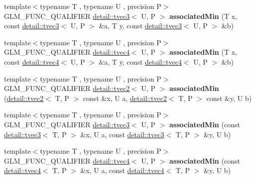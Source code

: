 \begin{DoxyCompactItemize}
\item 
{\footnotesize template$<$typename T , typename U , precision P$>$ }\\G\+L\+M\+\_\+\+F\+U\+N\+C\+\_\+\+Q\+U\+A\+L\+I\+F\+I\+ER \hyperlink{structglm_1_1detail_1_1tvec3}{detail\+::tvec3}$<$ U, P $>$ {\bfseries associated\+Min} (T x, const \hyperlink{structglm_1_1detail_1_1tvec3}{detail\+::tvec3}$<$ U, P $>$ \&a, T y, const \hyperlink{structglm_1_1detail_1_1tvec3}{detail\+::tvec3}$<$ U, P $>$ \&b)\hypertarget{namespaceglm_a546b865980a6592d3b0223d74ee70907}{}\label{namespaceglm_a546b865980a6592d3b0223d74ee70907}

\item 
{\footnotesize template$<$typename T , typename U , precision P$>$ }\\G\+L\+M\+\_\+\+F\+U\+N\+C\+\_\+\+Q\+U\+A\+L\+I\+F\+I\+ER \hyperlink{structglm_1_1detail_1_1tvec4}{detail\+::tvec4}$<$ U, P $>$ {\bfseries associated\+Min} (T x, const \hyperlink{structglm_1_1detail_1_1tvec4}{detail\+::tvec4}$<$ U, P $>$ \&a, T y, const \hyperlink{structglm_1_1detail_1_1tvec4}{detail\+::tvec4}$<$ U, P $>$ \&b)\hypertarget{namespaceglm_a1276323c70c6a08d73089c1f3734d3a1}{}\label{namespaceglm_a1276323c70c6a08d73089c1f3734d3a1}

\item 
{\footnotesize template$<$typename T , typename U , precision P$>$ }\\G\+L\+M\+\_\+\+F\+U\+N\+C\+\_\+\+Q\+U\+A\+L\+I\+F\+I\+ER \hyperlink{structglm_1_1detail_1_1tvec2}{detail\+::tvec2}$<$ U, P $>$ {\bfseries associated\+Min} (\hyperlink{structglm_1_1detail_1_1tvec2}{detail\+::tvec2}$<$ T, P $>$ const \&x, U a, \hyperlink{structglm_1_1detail_1_1tvec2}{detail\+::tvec2}$<$ T, P $>$ const \&y, U b)\hypertarget{namespaceglm_a4e89b83acf8c80dc111e5152e8e52a75}{}\label{namespaceglm_a4e89b83acf8c80dc111e5152e8e52a75}

\item 
{\footnotesize template$<$typename T , typename U , precision P$>$ }\\G\+L\+M\+\_\+\+F\+U\+N\+C\+\_\+\+Q\+U\+A\+L\+I\+F\+I\+ER \hyperlink{structglm_1_1detail_1_1tvec3}{detail\+::tvec3}$<$ U, P $>$ {\bfseries associated\+Min} (const \hyperlink{structglm_1_1detail_1_1tvec3}{detail\+::tvec3}$<$ T, P $>$ \&x, U a, const \hyperlink{structglm_1_1detail_1_1tvec3}{detail\+::tvec3}$<$ T, P $>$ \&y, U b)\hypertarget{namespaceglm_ab8754d89ded0882c28671f13a66a11de}{}\label{namespaceglm_ab8754d89ded0882c28671f13a66a11de}

\item 
{\footnotesize template$<$typename T , typename U , precision P$>$ }\\G\+L\+M\+\_\+\+F\+U\+N\+C\+\_\+\+Q\+U\+A\+L\+I\+F\+I\+ER \hyperlink{structglm_1_1detail_1_1tvec4}{detail\+::tvec4}$<$ U, P $>$ {\bfseries associated\+Min} (const \hyperlink{structglm_1_1detail_1_1tvec4}{detail\+::tvec4}$<$ T, P $>$ \&x, U a, const \hyperlink{structglm_1_1detail_1_1tvec4}{detail\+::tvec4}$<$ T, P $>$ \&y, U b)\hypertarget{namespaceglm_a5b01b43448d92d25fd2a93ab8bade0ee}{}\label{namespaceglm_a5b01b43448d92d25fd2a93ab8bade0ee}


\end{DoxyCompactItemize}
